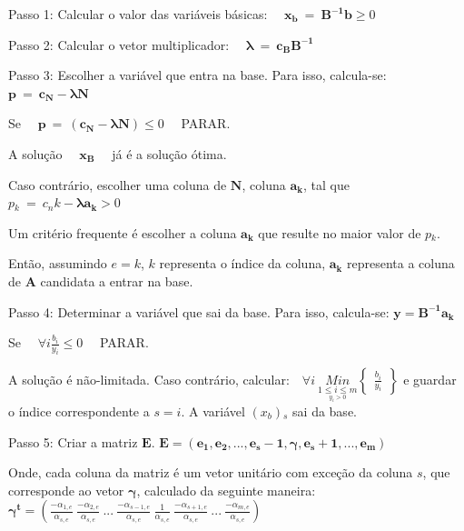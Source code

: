 Passo 1: Calcular o valor das variáveis básicas: \ \ $\mathbf{x_{b}}\ =\ \mathbf{B^{-1}b}\geq0$

Passo 2: Calcular o vetor multiplicador: \ \ $\mathbf{\lambda} \ =\ \mathbf{c{_B}B^{-1}}$

Passo 3: Escolher a variável que entra na base. Para isso, calcula-se: $\mathbf{p}\ =\ \mathbf{c{_N}}-\mathbf{\lambda N}$

Se \ \ $\mathbf{p}\ =\ (\mathbf{c{_N}}-\mathbf{\lambda N})\leq 0$ \ \ PARAR.

A solução \ \ $\mathbf{x{_B}}$ \ \ já é a solução ótima. 

Caso contrário, escolher uma coluna de $\mathbf{N}$, coluna $\mathbf{a{_k}}$, tal que $\mathit{p{_k}}\ =\ \mathit{c{_nk}}-\mathbf{\lambda a{_k}}> 0$

Um critério frequente é escolher a coluna $\mathbf{a{_k}}$ que resulte no maior valor de $\mathit{p{_k}}$.

Então, assumindo $\mathit{e} = \mathit{k}$, $\mathit{k}$ representa o índice da coluna, $\mathbf{a{_k}}$ representa a coluna de $\mathbf{A}$ candidata a entrar na base. 

Passo 4: Determinar a variável que sai da base. Para isso, calcula-se: $\mathbf{y}=\mathbf{B^{-1}a{_k}}$

Se \ \ $\forall i\mathit{\frac{b{_i}}{y{_i}}}\leq 0$ \ \ PARAR.

A solução é não-limitada. Caso contrário, calcular:\ \ 
$\forall i\ \underset{\underset{y{_i}>0}{1\leq i\leq m}}{Min}\begin{Bmatrix}
\mathit{\frac{b{_i}}{y{_i}}}
\end{Bmatrix}$ e guardar o índice correspondente a $s = i$. A variável $(x{_b}){_s}$ sai da base.

Passo 5: Criar a matriz $\mathbf{E}$.
$\mathbf{E}=(\mathbf{e{_1}},\mathbf{e{_2}},...,\mathbf{e{_s-1}},\mathbf{\gamma} , \mathbf{e{_s+1}},...,\mathbf{e{_m}})$

Onde, cada coluna da matriz é um vetor unitário com exceção da coluna $\mathit{s}$, que corresponde ao vetor $\mathbf{\gamma}$, calculado da seguinte maneira: \\
$\mathbf{\gamma^{t}}=\left( \mathit{\frac{-\alpha {_{1,e}}}{\alpha {_{s,e}}}}\ \mathit{\frac{-\alpha {_{2,e}}}{\alpha {_{s,e}}}}\ ...\ \mathit{\frac{-\alpha {_{s-1,e}}}{\alpha {_{s,e}}}}\ \mathit{\frac{1}{\alpha {_{s,e}}}\ \frac{-\alpha {_{s+1,e}}}{\alpha {_{s,e}}}}\ ...\ \mathit{\frac{-\alpha {_{m,e}}}{\alpha {_{s,e}}}} \right )$

